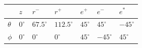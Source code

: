 \begin{tabular}{lllllll}
\hline
          & $z$       & $r^-$        & $r^+$         & $e^+$      & $e^-$       & $e^*$       \\
\hline
 $\theta$ & $0^\circ$ & $67.5^\circ$ & $112.5^\circ$ & $45^\circ$ & $45^\circ$  & $-45^\circ$ \\
 $\phi$   & $0^\circ$ & $0^\circ$    & $0^\circ$     & $45^\circ$ & $-45^\circ$ & $45^\circ$  \\
\hline
\end{tabular}

